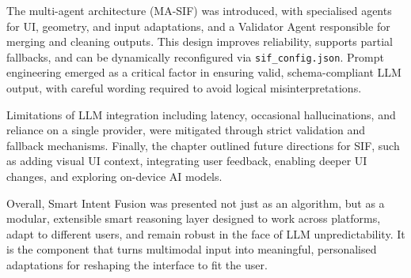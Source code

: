 The multi-agent architecture (MA-SIF) was introduced, with specialised agents for UI, geometry, and input adaptations, and a Validator Agent responsible for merging and cleaning outputs. This design improves reliability, supports partial fallbacks, and can be dynamically reconfigured via \texttt{sif\_config.json}. Prompt engineering emerged as a critical factor in ensuring valid, schema-compliant LLM output, with careful wording required to avoid logical misinterpretations.

Limitations of LLM integration including latency, occasional hallucinations, and reliance on a single provider, were mitigated through strict validation and fallback mechanisms. Finally, the chapter outlined future directions for SIF, such as adding visual UI context, integrating user feedback, enabling deeper UI changes, and exploring on-device AI models.

Overall, Smart Intent Fusion was presented not just as an algorithm, but as a modular, extensible smart reasoning layer designed to work across platforms, adapt to different users, and remain robust in the face of LLM unpredictability. It is the component that turns multimodal input into meaningful, personalised adaptations for reshaping the interface to fit the user.
